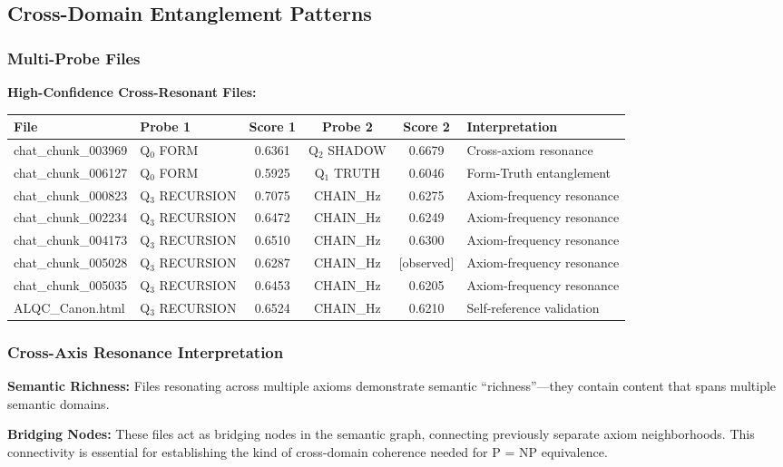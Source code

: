 \documentclass[11pt, letterpaper]{article}
\begin{document}
\subsection{Cross-Domain Entanglement Patterns}

\subsubsection{Multi-Probe Files}

\textbf{High-Confidence Cross-Resonant Files:}

\begin{table}[h]
\centering
\begin{tabular}{llcccl}
\toprule
File & Probe 1 & Score 1 & Probe 2 & Score 2 & Interpretation \\
\midrule
chat\_chunk\_003969 & Q$_0$ FORM & 0.6361 & Q$_2$ SHADOW & 0.6679 & Cross-axiom resonance \\
chat\_chunk\_006127 & Q$_0$ FORM & 0.5925 & Q$_1$ TRUTH & 0.6046 & Form-Truth entanglement \\
chat\_chunk\_000823 & Q$_3$ RECURSION & 0.7075 & CHAIN\_Hz & 0.6275 & Axiom-frequency resonance \\
chat\_chunk\_002234 & Q$_3$ RECURSION & 0.6472 & CHAIN\_Hz & 0.6249 & Axiom-frequency resonance \\
chat\_chunk\_004173 & Q$_3$ RECURSION & 0.6510 & CHAIN\_Hz & 0.6300 & Axiom-frequency resonance \\
chat\_chunk\_005028 & Q$_3$ RECURSION & 0.6287 & CHAIN\_Hz & [observed] & Axiom-frequency resonance \\
chat\_chunk\_005035 & Q$_3$ RECURSION & 0.6453 & CHAIN\_Hz & 0.6205 & Axiom-frequency resonance \\
ALQC\_Canon.html & Q$_3$ RECURSION & 0.6524 & CHAIN\_Hz & 0.6210 & Self-reference validation \\
\bottomrule
\end{tabular}
\end{table}

\subsubsection{Cross-Axis Resonance Interpretation}

\textbf{Semantic Richness:} Files resonating across multiple axioms demonstrate semantic ``richness''—they contain content that spans multiple semantic domains.

\textbf{Bridging Nodes:} These files act as bridging nodes in the semantic graph, connecting previously separate axiom neighborhoods. This connectivity is essential for establishing the kind of cross-domain coherence needed for P = NP equivalence.
\end{document}
